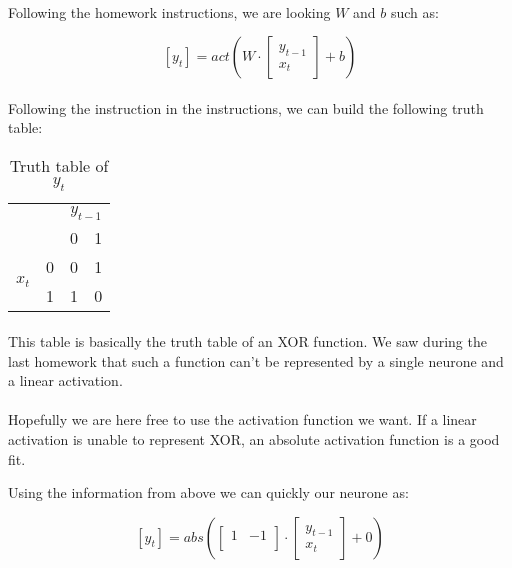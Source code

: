 
\paragraph{}
Following the homework instructions, we are looking $W$ and $b$ such as:

\[
    [y_t] = act\left( W \cdot
    \begin{bmatrix}
        y_{t-1} \\
        x_t
    \end{bmatrix}
    + b
    \right)
\]

\paragraph{}
Following the instruction in the instructions, we can build the following truth table:

\begin{table}[h!]
    \begin{center}
        \begin{tabular}{ll|ll}
            & \multicolumn{1}{c}{}  & \multicolumn{2}{c}{$y_{t-1}$} \\
            &   & 0 & 1 \\ \cline{2-4}
            \multirow{2}{*}{$x_t$}
            & 0 & 0 & 1 \\
            & 1 & 1 & 0 \\
        \end{tabular}
        \caption{Truth table of $y_t$}
    \end{center}
\end{table}

\paragraph{}
This table is basically the truth table of an XOR function.
We saw during the last homework that such a function can't be represented by a single neurone and a linear activation.

\paragraph{}
Hopefully we are here free to use the activation function we want.
If a linear activation is unable to represent XOR, an absolute activation function is a good fit.

Using the information from above we can quickly our neurone as:

\[
    [y_t] = abs\left(
    \begin{bmatrix}
        1 & -1 \\
    \end{bmatrix}
    \cdot
    \begin{bmatrix}
        y_{t-1} \\
        x_t
    \end{bmatrix}
    + 0
    \right)
\]
